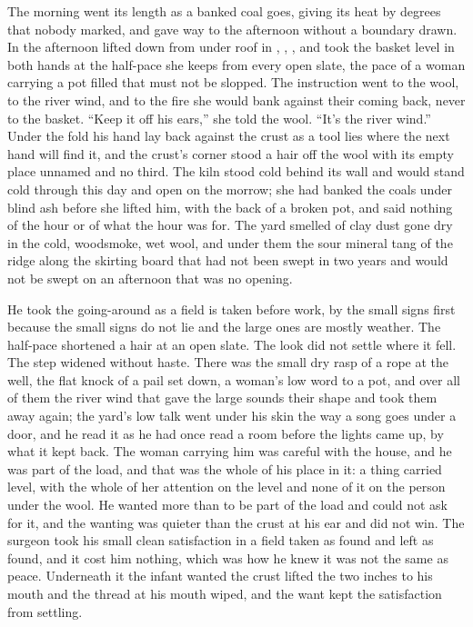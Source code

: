 The morning went its length as a banked coal goes, giving its heat by degrees that nobody marked, and gave way to the afternoon without a boundary drawn. In the afternoon  lifted  down from under  roof in , , , and took the basket level in both hands at the half-pace she keeps from every open slate, the pace of a woman carrying a pot filled that must not be slopped. The instruction went to the wool, to the river wind, and to the fire she would bank against their coming back, never to the basket. “Keep it off his ears,” she told the wool. “It's the river wind.” Under the fold his hand lay back against the crust as a tool lies where the next hand will find it, and the crust's corner stood a hair off the wool with its empty place unnamed and no third. The kiln stood cold behind its wall and would stand cold through this day and open on the morrow; she had banked the coals under blind ash before she lifted him, with the back of a broken pot, and said nothing of the hour or of what the hour was for. The yard smelled of clay dust gone dry in the cold, woodsmoke, wet wool, and under them the sour mineral tang of the ridge along the skirting board that had not been swept in two years and would not be swept on an afternoon that was no opening.

He took the going-around as a field is taken before work, by the small signs first because the small signs do not lie and the large ones are mostly weather. The half-pace shortened a hair at an open slate. The look did not settle where it fell. The step widened without haste. There was the small dry rasp of a rope at the well, the flat knock of a pail set down, a woman's low word to a pot, and over all of them the river wind that gave the large sounds their shape and took them away again; the yard's low talk went under his skin the way a song goes under a door, and he read it as he had once read a room before the lights came up, by what it kept back. The woman carrying him was careful with the house, and he was part of the load, and that was the whole of his place in it: a thing carried level, with the whole of her attention on the level and none of it on the person under the wool. He wanted more than to be part of the load and could not ask for it, and the wanting was quieter than the crust at his ear and did not win. The surgeon took his small clean satisfaction in a field taken as found and left as found, and it cost him nothing, which was how he knew it was not the same as peace. Underneath it the infant wanted the crust lifted the two inches to his mouth and the thread at his mouth wiped, and the want kept the satisfaction from settling.

